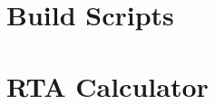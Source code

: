 \chapter{Build Scripts} %
\label{cha:build_scripts}




\chapter{RTA Calculator} %
\label{cha:rta_calculator}

